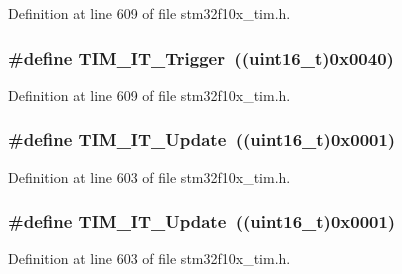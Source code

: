 Definition at line 609 of file stm32f10x\+\_\+tim.\+h.

\subsubsection[{\texorpdfstring{T\+I\+M\+\_\+\+I\+T\+\_\+\+Trigger}{TIM_IT_Trigger}}]{\setlength{\rightskip}{0pt plus 5cm}\#define T\+I\+M\+\_\+\+I\+T\+\_\+\+Trigger~(({\bf uint16\+\_\+t})0x0040)}\hypertarget{group___t_i_m__interrupt__sources_ga339629d21f2490729b28905f5c04bad1}{}\label{group___t_i_m__interrupt__sources_ga339629d21f2490729b28905f5c04bad1}


Definition at line 609 of file stm32f10x\+\_\+tim.\+h.

\subsubsection[{\texorpdfstring{T\+I\+M\+\_\+\+I\+T\+\_\+\+Update}{TIM_IT_Update}}]{\setlength{\rightskip}{0pt plus 5cm}\#define T\+I\+M\+\_\+\+I\+T\+\_\+\+Update~(({\bf uint16\+\_\+t})0x0001)}\hypertarget{group___t_i_m__interrupt__sources_ga8fb63577fec9a3e7c7f5f3eb775ee624}{}\label{group___t_i_m__interrupt__sources_ga8fb63577fec9a3e7c7f5f3eb775ee624}


Definition at line 603 of file stm32f10x\+\_\+tim.\+h.

\subsubsection[{\texorpdfstring{T\+I\+M\+\_\+\+I\+T\+\_\+\+Update}{TIM_IT_Update}}]{\setlength{\rightskip}{0pt plus 5cm}\#define T\+I\+M\+\_\+\+I\+T\+\_\+\+Update~(({\bf uint16\+\_\+t})0x0001)}\hypertarget{group___t_i_m__interrupt__sources_ga8fb63577fec9a3e7c7f5f3eb775ee624}{}\label{group___t_i_m__interrupt__sources_ga8fb63577fec9a3e7c7f5f3eb775ee624}


Definition at line 603 of file stm32f10x\+\_\+tim.\+h.

